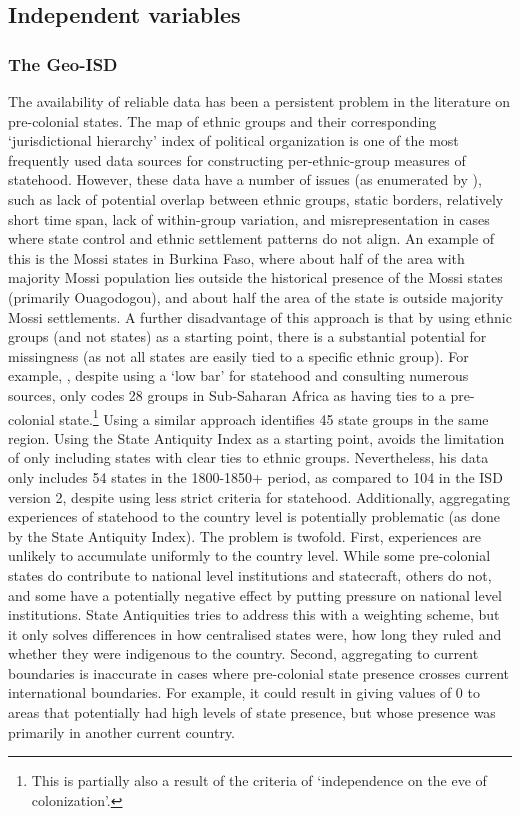 \subsection{Independent variables} \label{Independent variable}

\subsubsection{The Geo-ISD} \label{The Geo-ISD}

The availability of reliable data has been a persistent problem in the
literature on pre-colonial states. The \citet{Murdock1967} map of ethnic groups
and their corresponding `jurisdictional hierarchy' index of political
organization is one of the most frequently used data sources for constructing
per-ethnic-group measures of statehood. However, these data have a number of
issues (as enumerated by \citet{Michalopoulos2018}), such as lack of potential
overlap between ethnic groups, static borders, relatively short time span, lack
of within-group variation, and misrepresentation in cases where state control
and ethnic settlement patterns do not align. An example of this is the Mossi
states in Burkina Faso, where about half of the area with majority Mossi
population lies outside the historical presence of the Mossi states (primarily
Ouagodogou), and about half the area of the state is outside majority Mossi
settlements. A further disadvantage of this approach is that by using ethnic
groups (and not states) as a starting point, there is a substantial potential
for missingness (as not all states are easily tied to a specific ethnic group).
For example, \citet{Paine2019}, despite using a `low bar' for statehood and
consulting numerous sources, only codes 28 groups in Sub-Saharan Africa as
having ties to a pre-colonial state.\footnote{This is partially also a result of
the criteria of `independence on the eve of colonization'.} Using a similar
approach \citet{Wig2016} identifies 45 state groups in the same region. Using
the State Antiquity Index \citep{Bockstette2002} as a starting point,
\citet{Depetris-Chauvin2016} avoids the limitation of only including states with
clear ties to ethnic groups. Nevertheless, his data only includes 54 states in
the 1800-1850+ period, as compared to 104 in the ISD version 2, despite using
less strict criteria for statehood. Additionally, aggregating experiences of
statehood to the country level is potentially problematic (as done by the State
Antiquity Index). The problem is twofold. First, experiences are unlikely to
accumulate uniformly to the country level. While some pre-colonial states do
contribute to national level institutions and statecraft, others do not, and
some have a potentially negative effect by putting pressure on national level
institutions. State Antiquities tries to address this with a weighting scheme,
but it only solves differences in how centralised states were, how long they
ruled and whether they were indigenous to the country. Second, aggregating to
current boundaries is inaccurate in cases where pre-colonial state presence
crosses current international boundaries. For example, it could result in giving
values of 0 to areas that potentially had high levels of state presence, but
whose presence was primarily in another current country.

